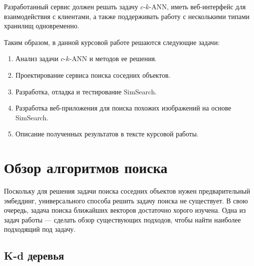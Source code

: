 \documentclass[a4paper,12pt]{extarticle}
\begin{document}
Разработанный сервис должен решать задачу $c$-$k$-ANN, иметь веб-интерфейс для взаимодействия с клиентами, а также поддерживать работу с несколькими типами хранилищ одновременно.

Таким образом, в данной курсовой работе решаются следующие задачи:

\begin{enumerate}
    \item Анализ задачи $c$-$k$-ANN и методов ее решения.
    \item Проектирование сервиса поиска соседних объектов.
    \item Разработка, отладка и тестирование SimSearch.
    \item Разработка веб-приложения для поиска похожих изображений на основе SimSearch.
    \item Описание полученных результатов в тексте курсовой работы.
\end{enumerate}

\newpage

\section {Обзор алгоритмов поиска}

Поскольку для решения задачи поиска соседних объектов нужен предварительный эмбеддинг, универсального способа решить задачу поиска не существует. В свою очередь, задача поиска ближайших векторов достаточно хорого изучена. Одна из задач работы --- сделать обзор существующих подходов, чтобы найти наиболее подходящий под задачу.


\subsection{K-d деревья}

\label{KD}
\end{document}
